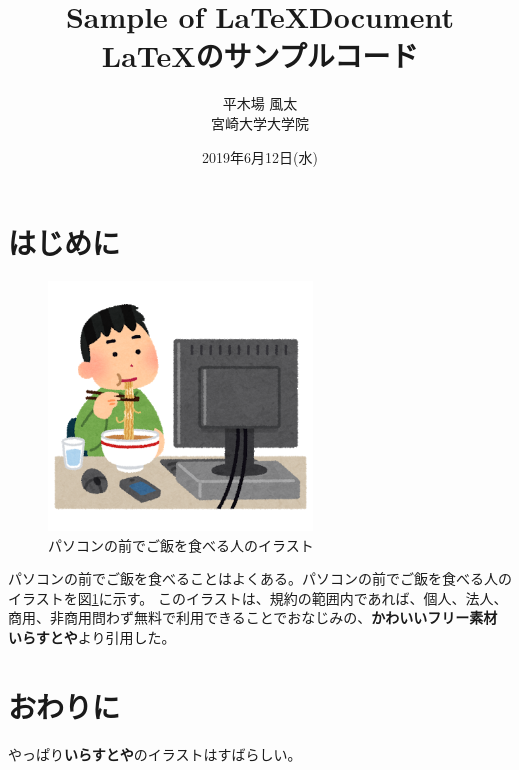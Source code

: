 \documentclass[uplatex, twocolumn,10pt]{jsarticle}
\begin{document}
\title{\bf{\LARGE{Sample of \LaTeX  Document} \\ \Large{\LaTeX のサンプルコード}}}
\author{平木場 風太\\宮崎大学大学院}
\date{2019年6月12日(水)}
\maketitle


\section{はじめに}
\begin{figure}[t]
    \begin{center}
        \includegraphics[width=7cm]{image/syokuji_computer.png}
        \caption{パソコンの前でご飯を食べる人のイラスト}
        \label{fig:syokuji_computer}
    \end{center}
\end{figure}

パソコンの前でご飯を食べることはよくある。パソコンの前でご飯を食べる人のイラストを図\ref{fig:syokuji_computer}に示す。
このイラストは、規約の範囲内であれば、個人、法人、商用、非商用問わず無料で利用できることでおなじみの、{\bf かわいいフリー素材 いらすとや}\cite{irasutoya}より引用した。

\section{おわりに}
やっぱり{\bf いらすとや}のイラストはすばらしい。
\end{document}
